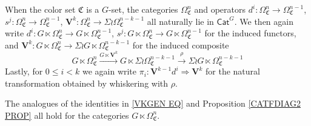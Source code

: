 \documentclass[a4paper,10pt
,draft
]{article}%
\renewcommand{\1}{\eta}%
\begin{document}
When the color set $\mathfrak{C}$ is a $G$-set, the categories 
$\Omega^n_{\mathfrak{C}}$ and operators
$d^i \colon \Omega^n_{\mathfrak{C}} \to \Omega^{n-1}_{\mathfrak{C}}$,
$s^j \colon \Omega^n_{\mathfrak{C}} \to \Omega^{n-1}_{\mathfrak{C}}$,
$\boldsymbol{V}^k \colon
\Omega_{\mathfrak{C}}^n \to 
\Sigma \wr \Omega_{\mathfrak{C}}^{n-k-1}$
all naturally lie in $\mathsf{Cat}^G$.
We then again write
$d^i \colon G \ltimes \Omega^n_{\mathfrak{C}} \to G \ltimes \Omega^{n-1}_{\mathfrak{C}}$,
$s^j \colon G \ltimes \Omega^n_{\mathfrak{C}} \to G \ltimes \Omega^{n-1}_{\mathfrak{C}}$ for the induced functors,
and 
$\boldsymbol{V}^k \colon
G \ltimes \Omega_{\mathfrak{C}}^n \to 
\Sigma \wr G \ltimes  \Omega_{\mathfrak{C}}^{n-k-1}$
for the induced composite
\[
G \ltimes \Omega_{\mathfrak{C}}^n 
\xrightarrow{G \ltimes \boldsymbol{V}^k } 
G \ltimes \Sigma \wr \Omega_{\mathfrak{C}}^{n-k-1}
\xrightarrow{\rho}
\Sigma \wr G \ltimes  \Omega_{\mathfrak{C}}^{n-k-1}
\]
Lastly, for $0 \leq i <k$ we again write 
$\pi_i \colon \boldsymbol{V}^{k-1} d^i
\Rightarrow 
\boldsymbol{V}^{k}$
for the natural transformation obtained by whiskering with $\rho$.


\begin{proposition}\label{ANOAN PROP}
The analogues of the identities in \eqref{VKGEN EQ} and 
Proposition \ref{CATFDIAG2 PROP}
all hold for the categories $G \ltimes \Omega^n_{\mathfrak{C}}$.
\end{proposition}
\end{document}
